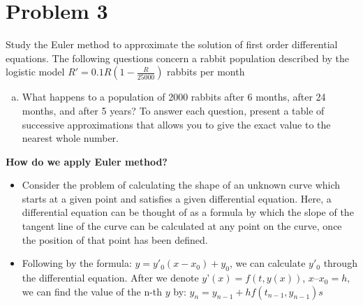 \documentclass[12pt,en,a4paper]{article}
\begin{document}
	\section*{Problem 3}
	Study the Euler method to approximate the solution of first order differential equations. The following questions concern a rabbit population described by the logistic model \(R'=0.1R(1-\frac{R}{25000})\) rabbits per month
	\begin{enumerate}[a)]
		\item What happens to a population of 2000 rabbits after 6 months, after 24 months, and after 5 years? To answer each question, present a table of successive approximations that allows you to give the exact value to the nearest whole number.
	\end{enumerate}
	\textbf{How do we apply Euler method?}
	\begin{itemize}
		\item Consider the problem of calculating the shape of an unknown curve which starts at a given point and satisfies a given differential equation. Here, a differential equation can be thought of as a formula by which the slope of the tangent line of the curve can be calculated at any point on the curve, once the position of that point has been defined.
		\item Following by the formula: \(y=y'_{0}(x-x_{0})+y_{0}\), we can calculate \(y'_{0}\) through the differential equation. After we denote \(y’(x) = f(t,y(x))\), \(x – x_{0} = h\), we can find the value of the n-th \(y\) by: \(y_{n}=y_{n-1}+hf(t_{n-1},y_{n-1})s\)
	\end{itemize}
\end{document}
